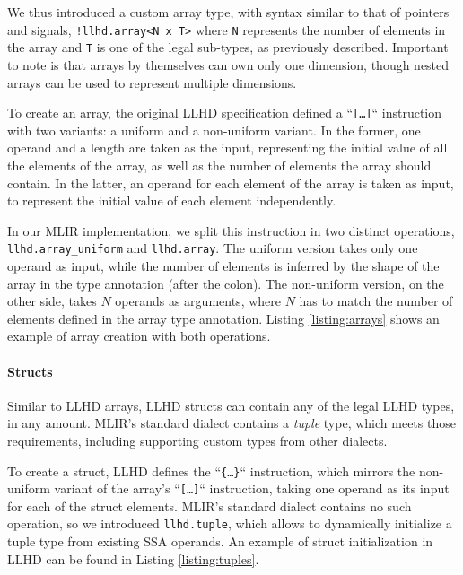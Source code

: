 We thus introduced a custom array type, with syntax similar to that of pointers and signals, \ie \texttt{!llhd.array<N x T>} where  \texttt{N} represents the number of elements in the array and \texttt{T} is one of the legal sub-types, as previously described. Important to note is that arrays by themselves can own only one dimension, though nested arrays can be used to represent multiple dimensions.

To create an array, the original LLHD specification defined a “\texttt{[\ldots]}“ instruction with two variants: a uniform and a non-uniform variant. In the former, one operand and a length are taken as the input, representing the initial value of all the elements of the array, as well as the number of elements the array should contain. In the latter, an operand for each element of the array is taken as input, to represent the initial value of each element independently.

In our MLIR implementation, we split this instruction in two distinct operations, \texttt{llhd.array\_uniform} and \texttt{llhd.array}. The uniform version takes only one operand as input, while the number of elements is inferred by the shape of the array in the type annotation (after the colon). The non-uniform version, on the other side, takes $N$ operands as arguments, where $N$ has to match the number of elements defined in the array type annotation. Listing \ref{listing:arrays} shows an example of array creation with both operations.


\paragraph{Structs}
Similar to LLHD arrays, LLHD structs can contain any of the legal LLHD types, in any amount. MLIR's standard dialect contains a \textit{tuple} type, which meets those requirements, including supporting custom types from other dialects.

To create a struct, LLHD defines the “\texttt{\{\ldots\}}“ instruction, which mirrors the non-uniform variant of the array's “\texttt{[\ldots]}“ instruction, taking one operand as its input for each of the struct elements. MLIR's standard dialect contains no such operation, so we introduced \texttt{llhd.tuple}, which allows to dynamically initialize a tuple type from existing SSA operands. An example of struct initialization in LLHD can be found in Listing \ref{listing:tuples}.

